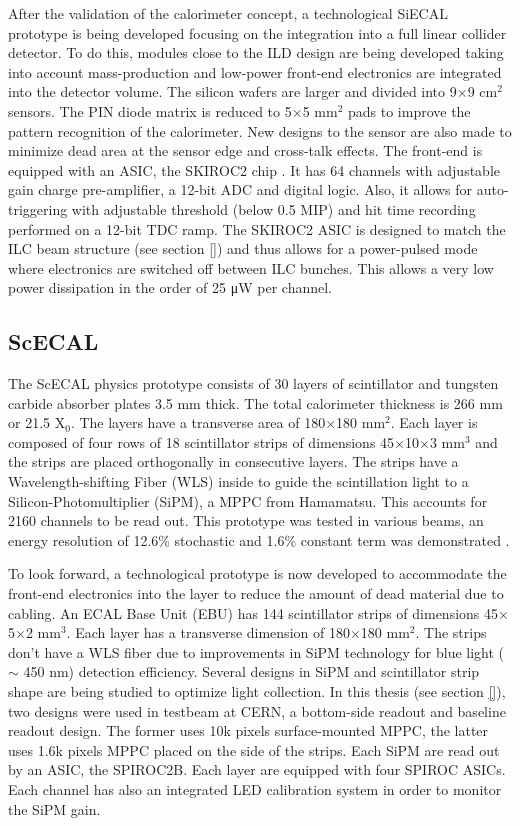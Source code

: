 After the validation of the calorimeter concept, a technological SiECAL prototype is being developed focusing on the integration into a full linear collider detector. To do this, modules close to the ILD design are being developed taking into account mass-production and low-power front-end electronics are integrated into the detector volume. The silicon wafers are larger and divided into 9$\times$9 cm$^2$ sensors. The PIN diode matrix is reduced to 5$\times$5 mm$^2$ pads to improve the pattern recognition of the calorimeter. New designs to the sensor are also made to minimize dead area at the sensor edge and cross-talk effects. The front-end is equipped with an ASIC, the SKIROC2 chip \cite{1748-0221-6-12-C12040}. It has 64 channels with adjustable gain charge pre-amplifier, a 12-bit ADC and digital logic. Also, it allows for auto-triggering with adjustable threshold (below 0.5 MIP) and hit time recording performed on a 12-bit TDC ramp. The SKIROC2 ASIC is designed to match the ILC beam structure (see section \ref{}) and thus allows for a power-pulsed mode where electronics are switched off between ILC bunches. This allows a very low power dissipation in the order of 25 \si{\micro\watt} per channel.

\subsection{ScECAL}
\label{subsec:ScECAL}

The ScECAL physics prototype consists of 30 layers of scintillator and tungsten carbide absorber plates 3.5 mm thick. The total calorimeter thickness is 266 mm or 21.5 X$_0$. The layers have a transverse area of 180$\times$180 mm$^2$. Each layer is composed of four rows of 18 scintillator strips of dimensions 45$\times$10$\times$3 mm$^3$ and the strips are placed orthogonally in consecutive layers. The strips have a Wavelength-shifting Fiber (WLS) inside to guide the scintillation light to a Silicon-Photomultiplier (SiPM), a MPPC from Hamamatsu. This accounts for 2160 channels to be read out. This prototype was tested in various beams, an energy resolution of 12.6\% stochastic and 1.6\% constant term was demonstrated \cite{1707.07126v2}.

To look forward, a technological prototype is now developed to accommodate the front-end electronics into the layer to reduce the amount of dead material due to cabling. An ECAL Base Unit (EBU) has 144 scintillator strips of dimensions 45$\times$5$\times$2 mm$^3$. Each layer has a transverse dimension of 180$\times$180 mm$^2$. The strips don't have a WLS fiber due to improvements in SiPM technology for blue light ($\sim$ 450 nm) detection efficiency. Several designs in SiPM and scintillator strip shape are being studied to optimize light collection. In this thesis (see section \ref{}), two designs were used in testbeam at CERN, a bottom-side readout and baseline readout design. The former uses 10k pixels surface-mounted MPPC, the latter uses 1.6k pixels MPPC placed on the side of the strips. Each SiPM are read out by an ASIC, the SPIROC2B. Each layer are equipped with four SPIROC ASICs. Each channel has also an integrated LED calibration system in order to monitor the SiPM gain.

